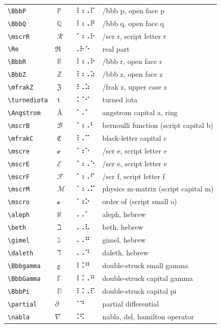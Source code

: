 \documentclass[oneside]{article}
\begin{document}
\begin{longtable}{llll}
\verb|\BbbP| & $\BbbP$ &  ⠸⠰⠠⠏  & {/bbb p, open face p} \\[2ex]
\verb|\BbbQ| & $\BbbQ$ &  ⠸⠰⠠⠟  & {/bbb q, open face q} \\[2ex]
\verb|\mscrR| & $\mscrR$ &  ⠈⠰⠠⠗  & {/scr r, script letter r} \\[2ex]
\verb|\Re| & $\Re$ &  ⠠⠗⠑  & {real part} \\[2ex]
\verb|\BbbR| & $\BbbR$ &  ⠸⠰⠠⠗  & {/bbb r, open face r} \\[2ex]
\verb|\BbbZ| & $\BbbZ$ &  ⠸⠰⠠⠵  & {/bbb z, open face z} \\[2ex]
\verb|\mfrakZ| & $\mfrakZ$ &  ⠸⠠⠵  & {/frak z, upper case z} \\[2ex]
\verb|\turnediota| & $\turnediota$ &  ⠨⠈⠊  & {turned iota} \\[2ex]
\verb|\Angstrom| & $\Angstrom$ &  ⠈⠠⠁  & {angstrom capital a, ring} \\[2ex]
\verb|\mscrB| & $\mscrB$ &  ⠈⠰⠠⠃  & {bernoulli function (script capital b)} \\[2ex]
\verb|\mfrakC| & $\mfrakC$ &  ⠸⠠⠉  & {black-letter capital c} \\[2ex]
\verb|\mscre| & $\mscre$ &  ⠈⠰⠑  & {/scr e, script letter e} \\[2ex]
\verb|\mscrE| & $\mscrE$ &  ⠈⠰⠠⠑  & {/scr e, script letter e} \\[2ex]
\verb|\mscrF| & $\mscrF$ &  ⠈⠰⠠⠋  & {/scr f, script letter f} \\[2ex]
\verb|\mscrM| & $\mscrM$ &  ⠈⠰⠠⠍  & {physics m-matrix (script capital m)} \\[2ex]
\verb|\mscro| & $\mscro$ &  ⠈⠰⠕  & {order of (script small o)} \\[2ex]
\verb|\aleph| & $\aleph$ &  ⠠⠠⠁  & {aleph, hebrew} \\[2ex]
\verb|\beth| & $\beth$ &  ⠠⠠⠧  & {beth, hebrew} \\[2ex]
\verb|\gimel| & $\gimel$ &  ⠠⠠⠛  & {gimel, hebrew} \\[2ex]
\verb|\daleth| & $\daleth$ &  ⠠⠠⠙  & {daleth, hebrew} \\[2ex]
\verb|\Bbbgamma| & $\Bbbgamma$ &  ⠸⠨⠛  & {double-struck small gamma} \\[2ex]
\verb|\BbbGamma| & $\BbbGamma$ &  ⠸⠨⠠⠛  & {double-struck capital gamma} \\[2ex]
\verb|\BbbPi| & $\BbbPi$ &  ⠸⠨⠠⠏  & {double-struck capital pi} \\[2ex]
\verb|\partial| & $\partial$ &  ⠈⠙  & {partial differential} \\[2ex]
\verb|\nabla| & $\nabla$ &  ⠨⠫  & {nabla, del, hamilton operator} \\[2ex]

\end{longtable}
\end{document}
